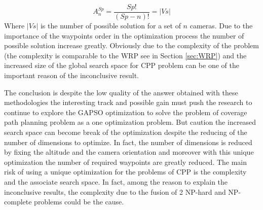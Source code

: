 \begin{itemize}
		\begin{equation} \label{eq:ArrangmentCPP}
			A^{Sp}_{n}=\frac{Sp!}{(Sp-n)!} = |Vs|
		\end{equation}
 Where $|Vs|$ is the number of possible solution for a set of $n$ cameras. Due to the importance of the waypoints order in the optimization process the number of possible solution increase greatly. Obviously due to the complexity of the problem  (the  complexity is comparable to the WRP see in Section \ref{sec:WRP}) and the increased size of the global search space for CPP problem  can be one of the important reason of the inconclusive result.
 \end{itemize}
		
The conclusion is despite the low quality of the answer obtained with these methodologies the interesting track and possible gain must push the research to continue to explore the GAPSO optimization to solve the problem of coverage path planning problem as a one optimization problem. But caution the increased search space can become break of the optimization despite the reducing of the number of dimensions to optimize. In fact, the number of dimensions is reduced by fixing the altitude and the camera orientation and moreover with this  unique optimization  the number of required waypoints are greatly reduced. 
The main risk of using  a unique optimization for the problems of CPP is the complexity and the associate search space. In fact, among the reason to explain the inconclusive results, the complexity due to the fusion of 2 NP-hard and NP-complete problems could be the cause. \\
		





